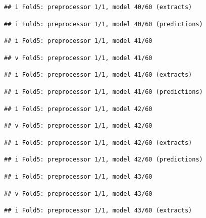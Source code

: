 \documentclass[
]{article}
\begin{document}
\begin{verbatim}
## i Fold5: preprocessor 1/1, model 40/60 (extracts)
\end{verbatim}

\begin{verbatim}
## i Fold5: preprocessor 1/1, model 40/60 (predictions)
\end{verbatim}

\begin{verbatim}
## i Fold5: preprocessor 1/1, model 41/60
\end{verbatim}

\begin{verbatim}
## v Fold5: preprocessor 1/1, model 41/60
\end{verbatim}

\begin{verbatim}
## i Fold5: preprocessor 1/1, model 41/60 (extracts)
\end{verbatim}

\begin{verbatim}
## i Fold5: preprocessor 1/1, model 41/60 (predictions)
\end{verbatim}

\begin{verbatim}
## i Fold5: preprocessor 1/1, model 42/60
\end{verbatim}

\begin{verbatim}
## v Fold5: preprocessor 1/1, model 42/60
\end{verbatim}

\begin{verbatim}
## i Fold5: preprocessor 1/1, model 42/60 (extracts)
\end{verbatim}

\begin{verbatim}
## i Fold5: preprocessor 1/1, model 42/60 (predictions)
\end{verbatim}

\begin{verbatim}
## i Fold5: preprocessor 1/1, model 43/60
\end{verbatim}

\begin{verbatim}
## v Fold5: preprocessor 1/1, model 43/60
\end{verbatim}

\begin{verbatim}
## i Fold5: preprocessor 1/1, model 43/60 (extracts)
\end{verbatim}
\end{document}
